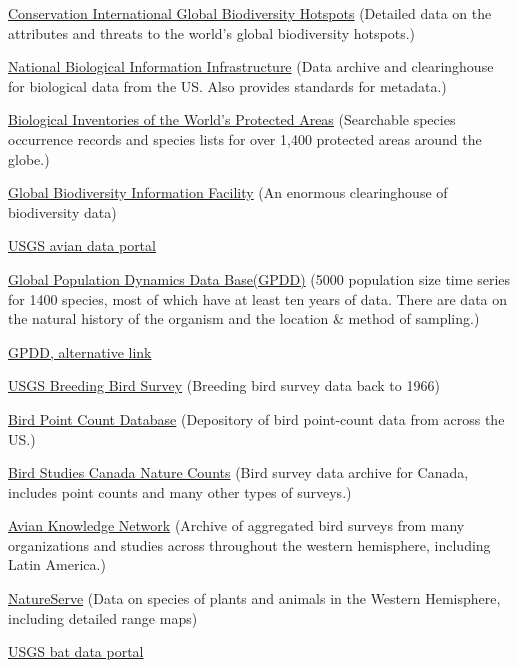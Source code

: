 \documentclass[
]{article}
\begin{document}
\href{http://www.biodiversityhotspots.org/Pages/default.aspx}{Conservation
International Global Biodiversity Hotspots} (Detailed data on the
attributes and threats to the world's global biodiversity hotspots.)

\href{http://www.nbii.gov/}{National Biological Information
Infrastructure} (Data archive and clearinghouse for biological data from
the US. Also provides standards for metadata.)

\href{http://www.ice.ucdavis.edu/bioinventory/bioinventory.html}{Biological
Inventories of the World's Protected Areas} (Searchable species
occurrence records and species lists for over 1,400 protected areas
around the globe.)

\href{http://data.gbif.org/welcome.htm}{Global Biodiversity Information
Facility} (An enormous clearinghouse of biodiversity data)

\href{https://migbirdapps.fws.gov/mbdc/databases/db_selection.html}{USGS
avian data portal}

\href{http://www3.imperial.ac.uk/cpb/research/patternsandprocesses/gpdd}{Global
Population Dynamics Data Base(GPDD)} (5000 population size time series
for 1400 species, most of which have at least ten years of data. There
are data on the natural history of the organism and the location \&
method of sampling.)

\href{https://www.imperial.ac.uk/cpb/gpdd2/secure/login.aspx}{GPDD,
alternative link}

\href{http://www.pwrc.usgs.gov/BBS/}{USGS Breeding Bird Survey}
(Breeding bird survey data back to 1966)

\href{http://www.pwrc.usgs.gov/point/}{Bird Point Count Database}
(Depository of bird point-count data from across the US.)

\href{http://www.bsc-eoc.org/birdmon/default/main.jsp}{Bird Studies
Canada Nature Counts} (Bird survey data archive for Canada, includes
point counts and many other types of surveys.)

\href{http://www.avianknowledge.net/content/datasets}{Avian Knowledge
Network} (Archive of aggregated bird surveys from many organizations and
studies across throughout the western hemisphere, including Latin
America.)

\href{http://www.natureserve.org/getData/index.jsp}{NatureServe} (Data
on species of plants and animals in the Western Hemisphere, including
detailed range maps)

\href{https://my.usgs.gov/bpd/}{USGS bat data portal}
\end{document}

